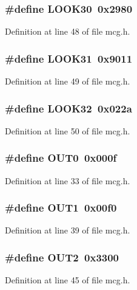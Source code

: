 \subsubsection{\setlength{\rightskip}{0pt plus 5cm}\#define LOOK30\ 0x2980}\label{mcg_8h_a13}




Definition at line 48 of file mcg.h.
\subsubsection{\setlength{\rightskip}{0pt plus 5cm}\#define LOOK31\ 0x9011}\label{mcg_8h_a14}




Definition at line 49 of file mcg.h.
\subsubsection{\setlength{\rightskip}{0pt plus 5cm}\#define LOOK32\ 0x022a}\label{mcg_8h_a15}




Definition at line 50 of file mcg.h.
\subsubsection{\setlength{\rightskip}{0pt plus 5cm}\#define OUT0\ 0x000f}\label{mcg_8h_a4}




Definition at line 33 of file mcg.h.
\subsubsection{\setlength{\rightskip}{0pt plus 5cm}\#define OUT1\ 0x00f0}\label{mcg_8h_a8}




Definition at line 39 of file mcg.h.
\subsubsection{\setlength{\rightskip}{0pt plus 5cm}\#define OUT2\ 0x3300}\label{mcg_8h_a12}




Definition at line 45 of file mcg.h.
